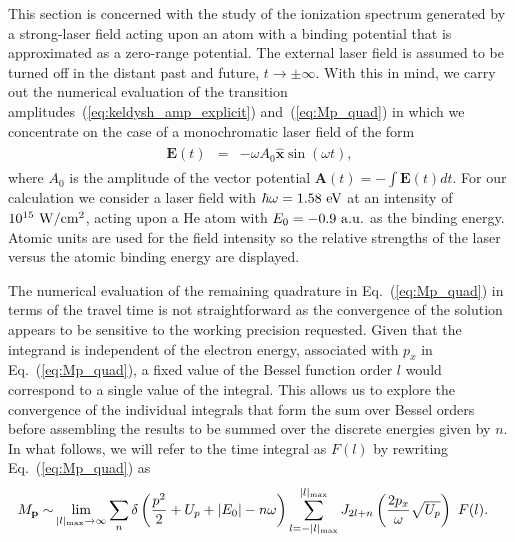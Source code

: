This section is concerned with the study of the ionization spectrum
generated by a strong-laser field acting upon an atom with a binding
potential that is approximated as a zero-range potential. The external
laser field is assumed to be turned off in the distant past and
future, $t\to\pm\infty$. With this in mind, we carry out the numerical
evaluation of the transition
amplitudes~(\ref{eq:keldysh_amp_explicit}) and~(\ref{eq:Mp_quad}) in
which we concentrate on the case of a monochromatic laser field of the
form
%
\begin{eqnarray}
\label{eq:lp_field}
\begin{split}
  \mathbf{E}(t) & = & -\omega A_{0} \hat{\mathbf{x}} \sin(\omega t),
\end{split}
\end{eqnarray}
%
where $A_{0}$ is the amplitude of the vector potential $\mathbf{A}(t)
= -\int \mathbf{E}(t) dt$. For our calculation we consider a laser
field with $\hbar\omega = 1.58\ \rm{eV}$ at an intensity of
$10^{15}\ \rm{W}/\rm{cm}^{2}$, acting upon a He atom with $E_{0} =
-0.9\ \rm{a.u.}$ as the binding energy. Atomic units are used for the
field intensity so the relative strengths of the laser versus the
atomic binding energy are displayed.

The numerical evaluation of the remaining quadrature in
Eq.~(\ref{eq:Mp_quad}) in terms of the travel time is not
straightforward as the convergence of the solution appears to be
sensitive to the working precision requested. Given that the integrand
is independent of the electron energy, associated with $p_{x}$ in
Eq.~(\ref{eq:Mp_quad}), a fixed value of the Bessel function order $l$
would correspond to a single value of the integral. This allows us to
explore the convergence of the individual integrals that form the sum
over Bessel orders before assembling the results to be summed over the
discrete energies given by $n$. In what follows, we will refer to the
time integral as $F(l)$ by rewriting Eq.~(\ref{eq:Mp_quad}) as
%
\begin{eqnarray}
\label{eq:Mp_rew}
\begin{split}
  M_{\mathbf{p}} \sim &
  \lim\limits_{|l|_{\rm{max}}\to\infty}
  \sum\limits_{n} \delta\left(\frac{p^{2}}{2} + U_{p} + |E_{0}| - n\omega\right)
  \sum\limits_{l=-|l|_{\rm{max}}}\limits^{|l|_{\rm{max}}}
  J_{2l+n}\left( \frac{2p_{x}}{\omega} \sqrt{U_{p}} \right)\ F(l).
\end{split}
\end{eqnarray}
%

